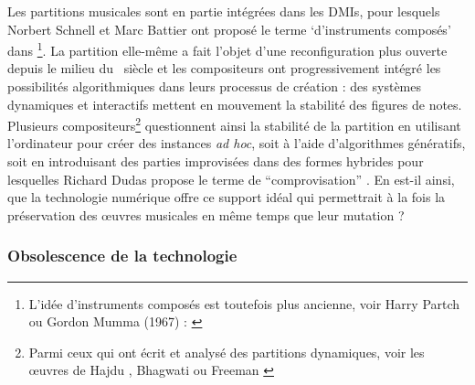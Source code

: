 \noindent Les partitions musicales sont en partie intégrées dans les \glspl{DMI}, pour lesquels Norbert Schnell et Marc Battier ont proposé le terme `d'instruments composés' dans \cite{schnell_introducing_2002}\footnote{L'idée d'instruments composés est toutefois plus ancienne, voir Harry Partch ou Gordon Mumma (1967) : \cite{mumma_creative_1967}}. La partition elle-même a fait l'objet d'une reconfiguration plus ouverte depuis le milieu du ~siècle et les compositeurs ont progressivement intégré les possibilités algorithmiques dans leurs processus de création : des systèmes dynamiques et interactifs mettent en mouvement la stabilité des figures de notes. Plusieurs compositeurs\footnote{Parmi ceux qui ont écrit et analysé des partitions dynamiques, voir les œuvres de Hajdu \cite{hajdu_disposable_2016}, Bhagwati \cite{bhagwati_vexations_2017} ou Freeman \cite{freeman_extreme_2008}} questionnent ainsi la stabilité de la partition en utilisant l'ordinateur pour créer des instances \textit{ad hoc}, soit à l'aide d'algorithmes génératifs, soit en introduisant des parties improvisées dans des formes hybrides pour lesquelles Richard Dudas propose le terme de ``comprovisation'' \cite{dudas_comprovisation:_2010}. En est-il ainsi, que la technologie numérique offre ce support idéal qui permettrait à la fois la préservation des œuvres musicales en même temps que leur mutation ?

\subsubsection{Obsolescence de la technologie}

